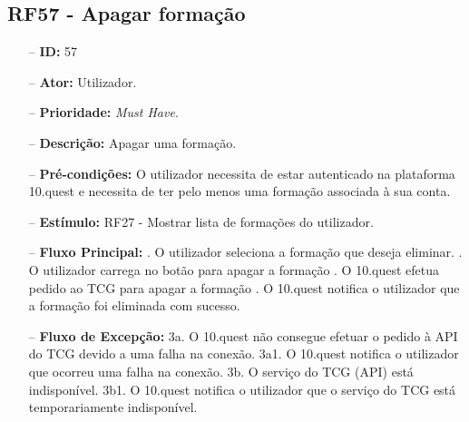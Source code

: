 \subsection{RF57 - Apagar formação}
\begin{itemize}
	\item[--] \textbf{ID:} 57
	\item[--]  \textbf{Ator:} Utilizador.
	\item[--]  \textbf{Prioridade:} \textit{Must Have}.
	\item[--]  \textbf{Descrição:} Apagar uma formação.
	\item[--]  \textbf{Pré-condições:} O utilizador necessita de estar autenticado na plataforma 10.quest e necessita de ter pelo menos uma formação associada à sua conta.
	\item[--]  \textbf{Estímulo:} RF27 - Mostrar lista de formações do utilizador.
	\item[--]  \textbf{Fluxo Principal:} 
	. O utilizador seleciona a formação que deseja eliminar.
	. O utilizador carrega no botão para apagar a formação
	. O 10.quest efetua pedido ao TCG para apagar a formação
	. O 10.quest notifica o utilizador que a formação foi eliminada com sucesso.
	\item[--]  \textbf{Fluxo de Excepção:} 
	\subitem 3a. O 10.quest não consegue efetuar o pedido à API do TCG devido a uma falha na conexão.
	\subitem 3a1. O 10.quest notifica o utilizador que ocorreu uma falha na conexão.
	\subitem 3b. O serviço do TCG (API) está indisponível.
	\subitem 3b1. O 10.quest notifica o utilizador que o serviço do TCG está temporariamente indisponível. 
\end{itemize}
\newpage

